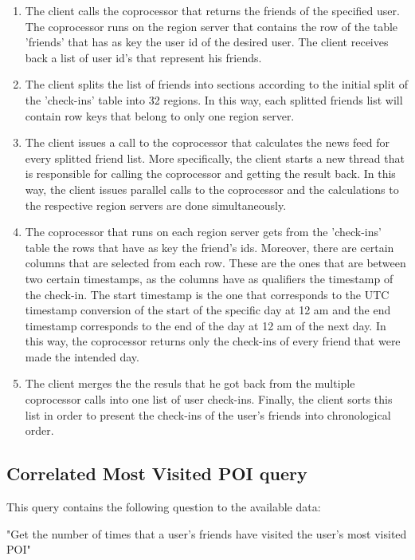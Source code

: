 \begin{enumerate}
 \item The client calls the coprocessor that returns the friends of the specified user. The coprocessor runs on the region server that contains 
 the row of the table 'friends' that has as key the user id of the desired user. The client receives back a list of user id's that 
 represent his friends.
 \item The client splits the list of friends into sections according to the initial split of the 'check-ins' table into 32 regions. In this way, 
 each splitted friends list will contain row keys that belong to only one region server.
 \item The client issues a call to the coprocessor that calculates the news feed for every splitted friend list. 
 More specifically, the client starts a new thread that is responsible for calling the coprocessor and getting the result back. 
 In this way, the client issues parallel calls to the coprocessor and the calculations to the respective region servers are done simultaneously.
 \item The coprocessor that runs on each region server gets from the 'check-ins' table the rows that have as key the friend's ids. Moreover, 
 there are certain columns that are selected from each row. These are the ones that are between two certain timestamps, as the columns have 
 as qualifiers the timestamp of the check-in. The start timestamp is the one that corresponds to the UTC timestamp conversion of the start of the 
 specific day at 12 am and the end timestamp corresponds to the end of the day at 12 am of the next day. In this way, the coprocessor returns 
 only the check-ins of every friend that were made the intended day.
 \item The client merges the the resuls that he got back from the multiple coprocessor calls into one list of user check-ins. Finally, 
 the client sorts this list in order to present the check-ins of the user's friends into chronological order.
\end{enumerate}

\subsection{Correlated Most Visited POI query}

This query contains the following question to the available data:
\begin{center}
 "Get the number of times that a user's friends have visited the user's most visited POI"
\end{center}

